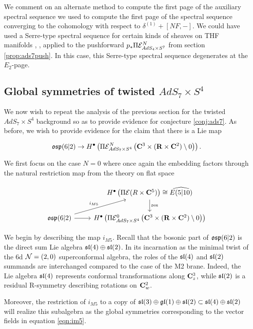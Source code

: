 \documentclass[../main.tex]{subfiles}
\begin{document}
\begin{rmk}\label{rmk:altss}
We comment on an alternate method to compute the first page of the auxiliary spectral sequence we used to compute the first page of the spectral sequence converging to the cohomology with respect to $\delta^{(1)} + [NF, - ]$. We could have used a Serre-type spectral sequence for certain kinds of sheaves on THF manifolds \cite{KamberTondeur}, \cite{KormanThesis}, applied to the pushforward $ p_* \Pi \mathcal{E}^N_{AdS_4\times S^7}$ from section \ref{prop:ads7push}. In this case, this Serre-type spectral sequence degenerates at the $E_2$-page.
\end{rmk}

\subsection{Global symmetries of twisted $AdS_7 \times S^4$}
We now wish to repeat the analysis of the previous section for the twisted $AdS_7\times S^4$ background so as to provide evidence for conjecture \ref{conj:ads7}. As before, we wish to provide evidence for the claim that there is a Lie map 

\[\mathfrak{osp}(6|2)\to H^\bullet \left ( \Pi \mathcal{E}^N_{AdS_7\times S^4} \left ( \mathbf{C}^3 \times (\mathbf{R}\times \mathbf{C}^2)\setminus 0 \right ) \right ).\]

We first focus on the case $N=0$ where once again the embedding factors through the natural restriction map from the theory on flat space

\[ 
\begin{tikzcd}
& H^\bullet \left ( \Pi \mc E (R\times \C^5)\right )\cong\widehat{E(5|10) }\ar[d, "\mr{res}"] \\
\mf{osp}(6|2)\ar[ur, "i_{M5}"]\ar[r] & H^\bullet \left ( \Pi \mc E^0_{AdS_7\times S^4} \left ( \C^3 \times (\R\times \C^2)\setminus 0 \right ) \right )
\end{tikzcd}
\]

\parsec[s:m5embedding]
We begin by describing the map $i_{M5}$. Recall that the bosonic part of $\mathfrak{osp}(6|2)$ is the direct sum Lie algebra $\mathfrak{sl}(4) \oplus \mathfrak{sl}(2)$. In its incarnation as the minimal twist of the 6d $\mathcal{N}=(2,0)$ superconformal algebra,  the roles of the $\mathfrak{sl}(4)$ and $\mathfrak{sl}(2)$ summands are interchanged compared to the case of the M2 brane. Indeed, the Lie algebra $\mathfrak{sl}(4)$ represents conformal transformations along $\mathbf{C}^3_z$, while $\mathfrak{sl}(2)$ is a residual R-symmetry describing rotations on $\mathbf{C}^2_w$.

Moreover, the restriction of $i_{M5}$ to a copy of $\mathfrak{sl}(3)\oplus\mathfrak{gl}(1)\oplus \mathfrak{sl}(2)\subset \mathfrak{sl}(4) \oplus \mathfrak{sl}(2)$ will realize this subalgebra as the global symmetries corresponding to the vector fields in equation \ref{eqn:im5}. 
\end{document}
